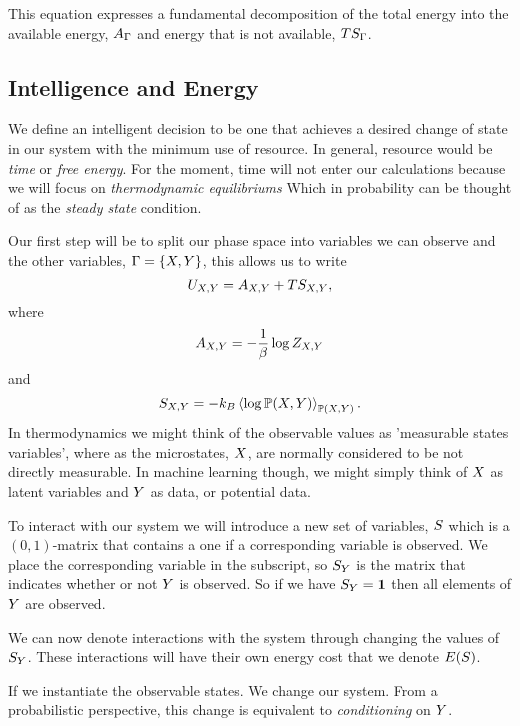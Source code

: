 \documentclass[]{article}
\begin{document}
This equation expresses a fundamental decomposition of the total energy
into the available energy, \(A_\Gamma\) and energy that is not
available, \(TS_\Gamma\).

\subsection{Intelligence and Energy}

We define an intelligent decision to be one that achieves a desired
change of state in our system with the minimum use of resource. In
general, resource would be \emph{time} or \emph{free energy}. For the
moment, time will not enter our calculations because we will focus on
\emph{thermodynamic equilibriums} Which in probability can be thought
of as the \emph{steady state} condition.

Our first step will be to split our phase space into variables we can
observe and the other variables,
\(\Gamma = \{X, Y\}\), this allows
us to write 
\[
U_{X,Y} = A_{X,Y} + TS_{X,Y},
\] 
where 
\[
A_{X,Y} = - \frac{1}{\beta}\log Z_{X,Y}
\] 
and 
\[
S_{X,Y} = -k_B \left\langle \log \mathbb{P}({X,Y}) \right\rangle_{\mathbb{P}({X,Y})}.
\]
In thermodynamics we might think of the observable values as 'measurable states variables', where as the microstates, $X$, are normally considered to be not directly measurable. In machine learning though, we might simply think of $X$ as latent variables and $Y$ as data, or potential data.

To interact with our system we will introduce a new set of variables, $S$ which is a $(0,1)$-matrix that contains a one if a corresponding variable is observed. We place the corresponding variable in the subscript, so $S_Y$ is the matrix that indicates whether or not $Y$ is observed. So if we have $S_Y = \mathbf{1}$ then all elements of $Y$ are observed. 

We can now denote interactions with the system through changing the values of $S_Y$. These interactions will have their own energy cost that we denote $E(S)$.

If we instantiate the observable states. We change our system. From a
probabilistic perspective, this change is equivalent to
\emph{conditioning} on \(Y\).
\end{document}
